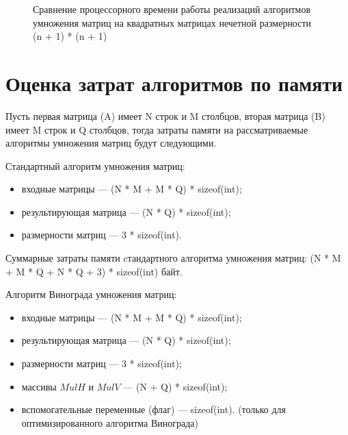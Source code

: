 \begin{figure}[h!]
	
	
	\caption{Сравнение процессорного времени работы реализаций алгоритмов умножения матриц на квадратных матрицах нечетной размерности (n + 1) * (n + 1)}
	
	\label{fig:fig2}
	
\end{figure}

\clearpage

\section{Оценка затрат алгоритмов по памяти}

Пусть первая матрица (A) имеет N строк и M столбцов, вторая матрица (B) имеет M строк и Q столбцов, тогда затраты памяти на рассматриваемые алгоритмы умножения матриц будут следующими.

Стандартный алгоритм умножения матриц:
\begin{itemize}
\item входные матрицы --- (N * M + M * Q) * sizeof(int); 
\item результирующая матрица --- (N * Q) * sizeof(int); 
\item размерности матриц ---  3 * sizeof(int).
\end{itemize}

Суммарные затраты памяти cтандартного алгоритма умножения матриц:
(N * M + M * Q + N * Q + 3) * sizeof(int) байт.

Алгоритм Винограда умножения матриц:
\begin{itemize}
\item входные матрицы --- (N * M + M * Q) * sizeof(int); 
\item результирующая матрица --- (N * Q) * sizeof(int); 
\item размерности матриц ---  3 * sizeof(int);
\item массивы $MulH$ и $MulV$ --- (N + Q) * sizeof(int);
\item вспомогательные переменные (флаг) --- sizeof(int). (только для оптимизированного алгоритма Винограда)
\end{itemize}

